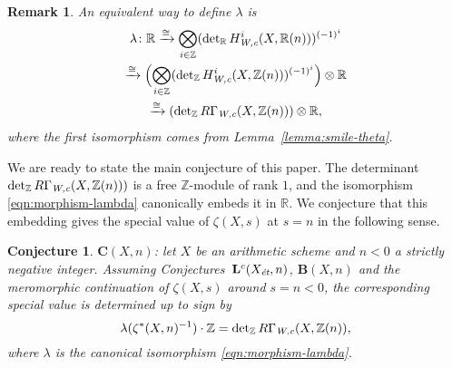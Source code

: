 \documentclass[10pt,a4paper,oneside]{article}
\newcommand{\RR}{\mathbb{R}}
\newcommand{\ZZ}{\mathbb{Z}}
\renewcommand{\det}{\operatorname{det}}
\newcommand{\et}{\text{\it \'{e}t}}
\newcommand{\Wc}{\text{\it W,c}}
\theoremstyle{myplain}
\theoremstyle{mydefinition}
\newtheorem{conjecture}[theorem]{Conjecture}
\newtheorem{remark}[theorem]{Remark}
\numberwithin{equation}{section}
\begin{document}
\begin{remark}
  An equivalent way to define $\lambda$ is
  \begin{multline*}
    \lambda\colon \RR \xrightarrow{\cong}
    \bigotimes_{i\in \ZZ} (\det_\RR H^i_\Wc (X, \RR (n)))^{(-1)^i} \\
    \xrightarrow{\cong} \Bigl(\bigotimes_{i\in \ZZ} (\det_\ZZ H^i_\Wc (X, \ZZ (n)))^{(-1)^i}\Bigr) \otimes \RR \\
    \xrightarrow{\cong} (\det_\ZZ R\Gamma_\Wc (X, \ZZ (n))) \otimes \RR,
  \end{multline*}
  where the first isomorphism comes from Lemma~\ref{lemma:smile-theta}.
\end{remark}

We are ready to state the main conjecture of this paper. The determinant
$\det_\ZZ R\Gamma_\Wc (X, \ZZ (n)))$ is a free $\ZZ$-module of rank $1$, and the
isomorphism \eqref{eqn:morphism-lambda} canonically embeds it in $\RR$. We
conjecture that this embedding gives the special value of $\zeta (X,s)$ at
$s = n$ in the following sense.

\begin{conjecture}
  $\mathbf{C} (X,n)$: let $X$ be an arithmetic scheme and $n < 0$ a strictly
  negative integer. Assuming Conjectures~$\mathbf{L}^c (X_\et, n)$,
  $\mathbf{B} (X,n)$ and the meromorphic continuation of $\zeta (X,s)$ around
  $s = n < 0$, the corresponding special value is determined up to sign by
  \[ \lambda (\zeta^* (X,n)^{-1}) \cdot \ZZ =
    \det_\ZZ R\Gamma_\Wc (X, \ZZ (n)), \]
  where $\lambda$ is the canonical isomorphism \eqref{eqn:morphism-lambda}.
\end{conjecture}
\end{document}
